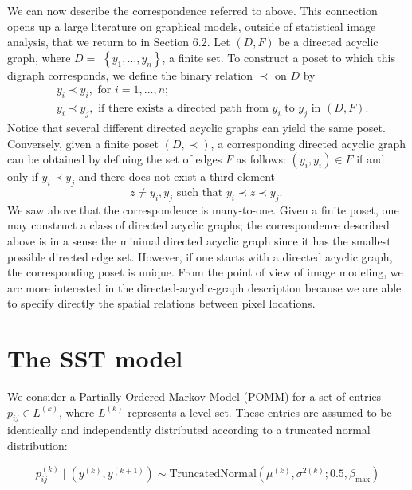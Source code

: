 \documentclass[11pt]{amsart}
\begin{document}
We can now describe the correspondence referred to above. This connection opens up a large literature on graphical models, outside of statistical image analysis, that we return to in Section 6.2. Let $(D, F)$ be a directed acyclic graph, where $D=$ $\left\{y_1, \ldots, y_n\right\}$, a finite set. To construct a poset to which this digraph corresponds, we define the binary relation $\prec$ on $D$ by
$$
\begin{aligned}
& y_i \prec y_i, \text { for } i=1, \ldots, n \text {; } \\
& y_i \prec y_j, \text { if there exists a directed path from } y_i \text { to } y_j \text { in }(D, F) .
\end{aligned}
$$
Notice that several different directed acyclic graphs can yield the same poset.
Conversely, given a finite poset $(D, \prec)$, a corresponding directed acyclic graph can be obtained by defining the set of edges $F$ as follows:
$\left(y_i, y_i\right) \in F$ if and only if $y_i \prec y_j$ and there does not exist a third element
$$
z \neq y_i, y_j \text { such that } y_i \prec z \prec y_j \text {. }
$$
We saw above that the correspondence is many-to-one. Given a finite poset, one may construct a class of directed acyclic graphs; the correspondence described above is in a sense the minimal directed acyclic graph since it has the smallest possible directed edge set. However, if one starts with a directed acyclic graph, the corresponding poset is unique. From the point of view of image modeling, we arc more interested in the directed-acyclic-graph description because we are able to specify directly the spatial relations between pixel locations.



\section{The SST model}


We consider a Partially Ordered Markov Model (POMM) for a set of entries $p_{ij} \in L^{(k)}$, where $L^{(k)}$ represents a level set. These entries are assumed to be identically and independently distributed according to a truncated normal distribution:

\[
p_{ij}^{(k)} \mid (y^{(k)}, y^{(k+1)}) \sim \text{TruncatedNormal}(\mu^{(k)}, \sigma^{2(k)}; 0.5, \beta_{\max})
\]
\end{document}
